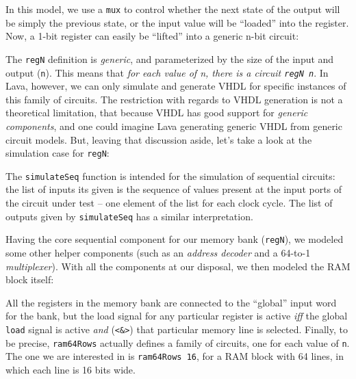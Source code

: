 
            In this model, we use a \texttt{mux} to control whether the next state of the output
            will be simply the previous state, or the input value will be ``loaded'' into the
            register. Now, a 1-bit register can easily be ``lifted'' into a generic n-bit circuit:


            The \texttt{regN} definition is \emph{generic}, and parameterized by the size of the
            input and output (\texttt{n}). This means that \emph{for each value of n, there is a
                circuit \texttt{regN n}}. In Lava, however, we can only simulate and generate VHDL
            for specific instances of this family of circuits. The restriction with regards to VHDL
            generation is not a theoretical limitation, that because VHDL has good support for
            \emph{generic components}, and one could imagine Lava generating generic VHDL from
            generic circuit models. But, leaving that discussion aside, let's take a look at the
            simulation case for \texttt{regN}:


            The \texttt{simulateSeq} function is intended for the simulation of sequential circuits:
            the list of inputs its given is the sequence of values present at the input ports of the
            circuit under test -- one element of the list for each clock cycle. The list of outputs
            given by \texttt{simulateSeq} has a similar interpretation.

            Having the core sequential component for our memory bank (\texttt{regN}), we modeled
            some other helper components (such as an \emph{address decoder} and a 64-to-1
            \emph{multiplexer}). With all the components at our disposal, we then modeled the RAM
            block itself:


            All the registers in the memory bank are connected to the ``global'' input word for the
            bank, but the load signal for any particular register is active \emph{iff} the global
            \texttt{load} signal is active \emph{and} (\texttt{<\&>}) that particular memory line is
            selected. Finally, to be precise, \texttt{ram64Rows} actually defines a family of
            circuits, one for each value of \texttt{n}. The one we are interested in is
            \texttt{ram64Rows 16}, for a RAM block with 64 lines, in which each line is 16 bits
            wide.

